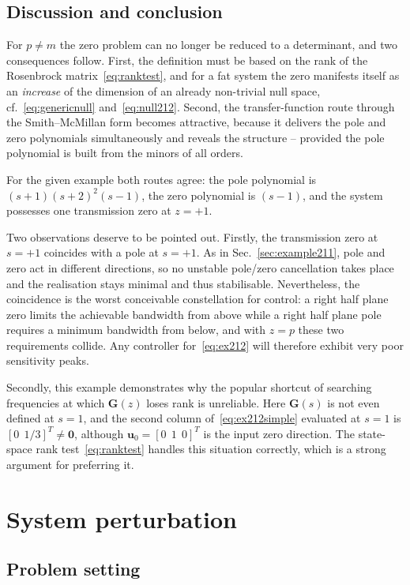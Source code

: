 \subsection{Discussion and conclusion}

For $p\neq m$ the zero problem can no longer be reduced to a determinant, and two consequences
follow. First, the definition must be based on the rank of the Rosenbrock
matrix~\eqref{eq:ranktest}, and for a fat system the zero manifests itself as an \emph{increase}
of the dimension of an already non-trivial null space, cf.~\eqref{eq:genericnull}
and~\eqref{eq:null212}. Second, the transfer-function route through the Smith--McMillan form
becomes attractive, because it delivers the pole and zero polynomials simultaneously and reveals
the structure -- provided the pole polynomial is built from the minors of all orders.

For the given example both routes agree: the pole polynomial is $(s+1)(s+2)^2(s-1)$, the zero
polynomial is $(s-1)$, and the system possesses one transmission zero at $z=+1$.

Two observations deserve to be pointed out. Firstly, the transmission zero at $s=+1$ coincides
with a pole at $s=+1$. As in Sec.~\ref{sec:example211}, pole and zero act in different
directions, so no unstable pole/zero cancellation takes place and the realisation stays minimal
and thus stabilisable. Nevertheless, the coincidence is the worst conceivable constellation for
control: a right half plane zero limits the achievable bandwidth from above while a right half
plane pole requires a minimum bandwidth from below, and with $z=p$ these two requirements
collide. Any controller for~\eqref{eq:ex212} will therefore exhibit very poor sensitivity peaks.

Secondly, this example demonstrates why the popular shortcut of searching frequencies at which
$\mathbf{G}(z)$ loses rank is unreliable. Here $\mathbf{G}(s)$ is not even defined at $s=1$, and
the second column of~\eqref{eq:ex212simple} evaluated at $s=1$ is $[0\ \ 1/3]^T\neq\mathbf{0}$,
although $\mathbf{u}_0=[0\ \ 1\ \ 0]^T$ is the input zero direction. The state-space rank
test~\eqref{eq:ranktest} handles this situation correctly, which is a strong argument for
preferring it.

\section{System perturbation}
\label{sec:perturbation}

\subsection{Problem setting}

